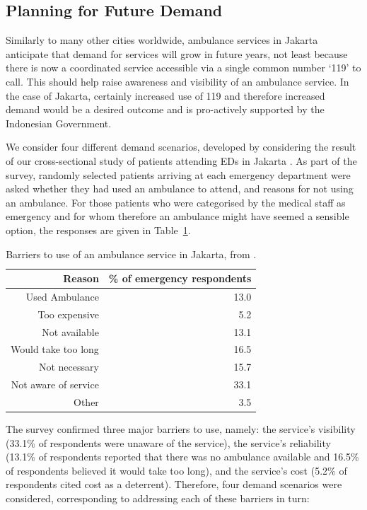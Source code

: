 \documentclass[numbers,webpdf,imaman]{ima-authoring-template}%
\begin{document}
\subsection{Planning for Future Demand}\label{sec:demand_scenarios}
Similarly to many other cities worldwide, ambulance services in Jakarta
anticipate that demand for services will grow in future years, not least because
there is now a coordinated service accessible via a single common number `119'
to call. This should help raise awareness and visibility of an ambulance
service. In the case of Jakarta, certainly increased use of 119 and therefore
increased demand would be a desired outcome and is pro-actively supported
by the Indonesian Government. 

We consider four different demand scenarios, developed by considering the
result of our cross-sectional study of patients attending EDs in Jakarta
\citep{BriceSyaribahNoor2022Esui}. As part of the survey, randomly selected
patients arriving at each emergency department were asked whether they had
used an ambulance to attend, and reasons for not using an ambulance. For those
patients who were categorised by the medical staff as emergency and for whom
therefore an ambulance might have seemed a sensible option, the responses are
given in Table~\ref{table:survey_results}.

\begin{table}
\centering
\begin{tabular}{rr}
\toprule
Reason & \% of emergency respondents \\
\midrule
Used Ambulance & 13.0\\
Too expensive & 5.2  \\
Not available  & 13.1 \\
Would take too long & 16.5 \\
Not necessary & 15.7  \\
Not aware of service & 33.1\\
Other &3.5 \\
\bottomrule
\end{tabular}
\caption{Barriers to use of an ambulance service in Jakarta, from
         \citet{BriceSyaribahNoor2022Esui}.}
\label{table:survey_results}
\end{table}

The survey confirmed three major barriers to use, namely: the service's
visibility (33.1\% of respondents were unaware of the service), the service's
reliability (13.1\% of respondents reported that there was no ambulance
available and 16.5\% of respondents believed it would take too long), and the
service's cost (5.2\% of respondents cited cost as a deterrent). Therefore,
four demand scenarios were considered, corresponding to addressing each of
these barriers in turn:
\end{document}
